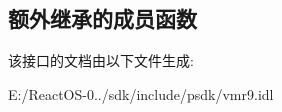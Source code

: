 \subsection*{额外继承的成员函数}


该接口的文档由以下文件生成\+:\begin{DoxyCompactItemize}
\item 
E\+:/\+React\+O\+S-\/0../sdk/include/psdk/vmr9.\+idl\end{DoxyCompactItemize}
